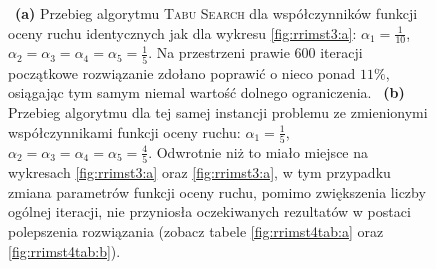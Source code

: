 \begin{figure}[!h]
{		~\textbf{(a)} Przebieg algorytmu \textsc{Tabu Search} dla współczynników funkcji oceny ruchu identycznych jak dla wykresu \ref{fig:rrimst3:a}: $\alpha_{1} = \frac{1}{10}$, $\alpha_{2} = \alpha_{3} = \alpha_{4} = \alpha_{5} = \frac{1}{5}$. Na przestrzeni prawie $600$ iteracji początkowe rozwiązanie zdołano poprawić o nieco ponad $11\%$, osiągając tym samym niemal wartość dolnego ograniczenia.
		~\textbf{(b)} Przebieg algorytmu dla tej samej instancji problemu ze zmienionymi współczynnikami funkcji oceny ruchu: $\alpha_{1} = \frac{1}{5}$, $\alpha_{2} = \alpha_{3} = \alpha_{4} = \alpha_{5} = \frac{4}{5}$. Odwrotnie niż to miało miejsce na wykresach \ref{fig:rrimst3:a} oraz \ref{fig:rrimst3:a}, w tym przypadku zmiana parametrów funkcji oceny ruchu, pomimo zwiększenia liczby ogólnej iteracji, nie przyniosła oczekiwanych rezultatów w postaci polepszenia rozwiązania (zobacz tabele \ref{fig:rrimst4tab:a} oraz \ref{fig:rrimst4tab:b}).
	}
	\label{fig:rrimst4}
\end{figure}

